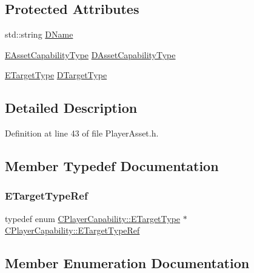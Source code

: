 \subsection*{Protected Attributes}
\begin{DoxyCompactItemize}
\item 
std\+::string \hyperlink{classCPlayerCapability_aae795f4ae4c19a9c7792a4101ca18560}{D\+Name}
\item 
\hyperlink{GameDataTypes_8h_a35b98ce26aca678b03c6f9f76e4778ce}{E\+Asset\+Capability\+Type} \hyperlink{classCPlayerCapability_a09011bc8c74c698bfb65f06a1840c6e1}{D\+Asset\+Capability\+Type}
\item 
\hyperlink{classCPlayerCapability_a9d3450ed1532fd536bd6cbb1e2eef02f}{E\+Target\+Type} \hyperlink{classCPlayerCapability_af3e2c3d386fbdce314d36e3e16ee823c}{D\+Target\+Type}
\end{DoxyCompactItemize}


\subsection{Detailed Description}


Definition at line 43 of file Player\+Asset.\+h.



\subsection{Member Typedef Documentation}
\hypertarget{classCPlayerCapability_aaf4a5763a2fa5b81c138c52da0888e87}{}\label{classCPlayerCapability_aaf4a5763a2fa5b81c138c52da0888e87} 
\subsubsection{\texorpdfstring{E\+Target\+Type\+Ref}{ETargetTypeRef}}
{\footnotesize\ttfamily typedef  enum \hyperlink{classCPlayerCapability_a9d3450ed1532fd536bd6cbb1e2eef02f}{C\+Player\+Capability\+::\+E\+Target\+Type} $\ast$ \hyperlink{classCPlayerCapability_aaf4a5763a2fa5b81c138c52da0888e87}{C\+Player\+Capability\+::\+E\+Target\+Type\+Ref}}



\subsection{Member Enumeration Documentation}
\hypertarget{classCPlayerCapability_a9d3450ed1532fd536bd6cbb1e2eef02f}{}\label{classCPlayerCapability_a9d3450ed1532fd536bd6cbb1e2eef02f} 
